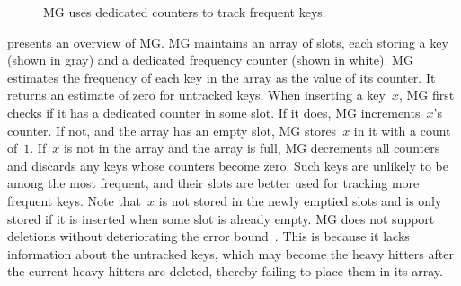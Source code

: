 \documentclass[sigconf]{acmart}
\begin{document}
\begin{figure}
    \caption{MG uses dedicated counters to track frequent keys.}
    \label{fig:mg_overview}
\end{figure}

 presents an overview of MG. MG maintains an array of
slots, each storing a key (shown in gray) and a dedicated frequency counter
(shown in white). MG estimates the frequency of each key in the array as the
value of its counter. It returns an estimate of zero for untracked keys. When
inserting a key~$x$, MG first checks if it has a dedicated counter in some
slot. If it does, MG increments~$x$'s counter. If not, and the array has an
empty slot, MG stores~$x$ in it with a count of~$1$. If~$x$ is not in the array
and the array is full, MG decrements all counters and discards any keys whose
counters become zero. Such keys are unlikely to be among the most frequent, and
their slots are better used for tracking more frequent keys. Note that~$x$ is
not stored in the newly emptied slots and is only stored if it is inserted when
some slot is already empty. MG does not support deletions without deteriorating
the error bound~\cite{BatchUpdateMisraGries}. This is because it lacks
information about the untracked keys, which may become the heavy hitters after
the current heavy hitters are deleted, thereby failing to place them in its
array.
\end{document}
